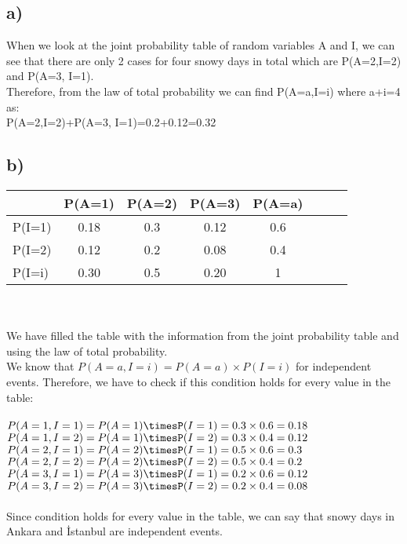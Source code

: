 \documentclass[12pt]{article}
\begin{document}
\subsection*{a)}
When we look at the joint probability table of random variables A and I, we can see that there are only 2 cases for four snowy days in total which are P(A=2,I=2) and P(A=3, I=1).\\ 
Therefore, from the law of total probability we can find P(A=a,I=i) where a+i=4 as:\\
P(A=2,I=2)+P(A=3, I=1)=0.2+0.12=0.32
\subsection*{b)}
\begin{tabular}{l*{6}{c}r}
                & P(A=1)& P(A=2)  & P(A=3) & P(A=a) \\
\hline
P(I=1)            & 0.18 & 0.3  & 0.12 & 0.6\\
P(I=2)            & 0.12 & 0.2  & 0.08 & 0.4\\
P(I=i)              & 0.30 & 0.5  & 0.20 & 1\\
\end{tabular}\\\\
We have filled the table with the information from the joint probability table and using the law of total probability.\\
We know that $P(A=a,I=i)=P(A=a)\times P(I=i)$ for independent events. 
Therefore, we have to check if this condition holds for every value in the table:\\\\
$P(A=1,I=1)=P(A=1)\timesP(I=1)=0.3\times0.6=0.18$\\
$P(A=1,I=2)=P(A=1)\timesP(I=2)=0.3\times0.4=0.12$\\
$P(A=2,I=1)=P(A=2)\timesP(I=1)=0.5\times0.6=0.3$\\
$P(A=2,I=2)=P(A=2)\timesP(I=2)=0.5\times0.4=0.2$\\
$P(A=3,I=1)=P(A=3)\timesP(I=1)=0.2\times0.6=0.12$\\
$P(A=3,I=2)=P(A=3)\timesP(I=2)=0.2\times0.4=0.08$\\\\
Since condition holds for every value in the table, we can say that snowy days in Ankara and İstanbul are independent events. 
\end{document}
